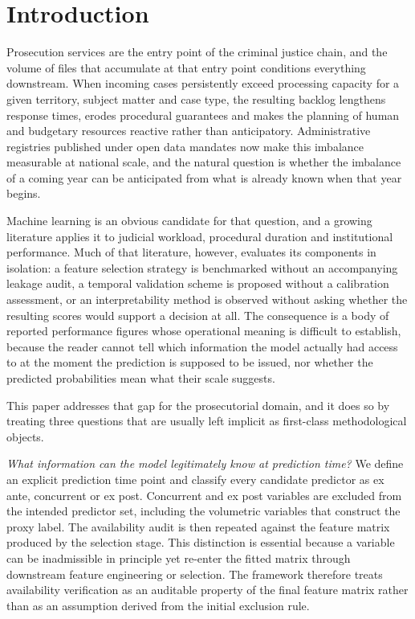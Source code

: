 \documentclass[sn-vancouver,Numbered]{sn-jnl}
\begin{document}

\maketitle

\section{Introduction}\label{sec:intro}

Prosecution services are the entry point of the criminal justice chain, and the volume of files that accumulate at that entry point conditions everything downstream. When incoming cases persistently exceed processing capacity for a given territory, subject matter and case type, the resulting backlog lengthens response times, erodes procedural guarantees and makes the planning of human and budgetary resources reactive rather than anticipatory. Administrative registries published under open data mandates now make this imbalance measurable at national scale, and the natural question is whether the imbalance of a coming year can be anticipated from what is already known when that year begins.

Machine learning is an obvious candidate for that question, and a growing literature applies it to judicial workload, procedural duration and institutional performance. Much of that literature, however, evaluates its components in isolation: a feature selection strategy is benchmarked without an accompanying leakage audit, a temporal validation scheme is proposed without a calibration assessment, or an interpretability method is observed without asking whether the resulting scores would support a decision at all. The consequence is a body of reported performance figures whose operational meaning is difficult to establish, because the reader cannot tell which information the model actually had access to at the moment the prediction is supposed to be issued, nor whether the predicted probabilities mean what their scale suggests.

This paper addresses that gap for the prosecutorial domain, and it does so by treating three questions that are usually left implicit as first-class methodological objects.

\emph{What information can the model legitimately know at prediction time?} We define an explicit prediction time point and classify every candidate predictor as ex ante, concurrent or ex post. Concurrent and ex post variables are excluded from the intended predictor set, including the volumetric variables that construct the proxy label. The availability audit is then repeated against the feature matrix produced by the selection stage. This distinction is essential because a variable can be inadmissible in principle yet re-enter the fitted matrix through downstream feature engineering or selection. The framework therefore treats availability verification as an auditable property of the final feature matrix rather than as an assumption derived from the initial exclusion rule.
\end{document}
